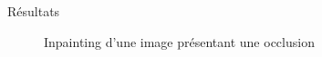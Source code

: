 \documentclass[final,hyperref={pdfpagelabels=false}]{beamer}
\begin{document}
\begin{frame}[t]
\begin{columns}[t]
\begin{column}{.465\textwidth}
\begin{block}{\Large Résultats}
\begin{figure}[H]
\centering
{}
\caption{Inpainting d'une image présentant une occlusion}
\end{figure}


\end{block}
\end{column}
\end{columns}
\end{frame}
\end{document}
